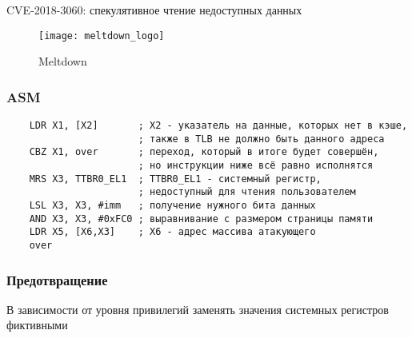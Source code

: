 \begin{frame}{\insertsubsection}

  CVE-2018-3060: спекулятивное чтение недоступных данных

  \begin{figure}[h]
    \texttt{[image: meltdown\_logo]}
    \caption{Meltdown}
  \end{figure}

\end{frame}

\subsubsection{ASM}
\begin{frame}[fragile]{\insertsubsubsection}

  \begin{verbatim}
    LDR X1, [X2]       ; X2 - указатель на данные, которых нет в кэше,
                       ; также в TLB не должно быть данного адреса
    CBZ X1, over       ; переход, который в итоге будет совершён,
                       ; но инструкции ниже всё равно исполнятся
    MRS X3, TTBR0_EL1  ; TTBR0_EL1 - системный регистр,
                       ; недоступный для чтения пользователем
    LSL X3, X3, #imm   ; получение нужного бита данных
    AND X3, X3, #0xFC0 ; выравнивание с размером страницы памяти
    LDR X5, [X6,X3]    ; X6 - адрес массива атакующего
    over
  \end{verbatim}


\end{frame}

\subsubsection{Предотвращение}
\begin{frame}{\insertsubsubsection}

  \LARGE

  В зависимости от уровня привилегий заменять значения системных регистров
  фиктивными


\end{frame}